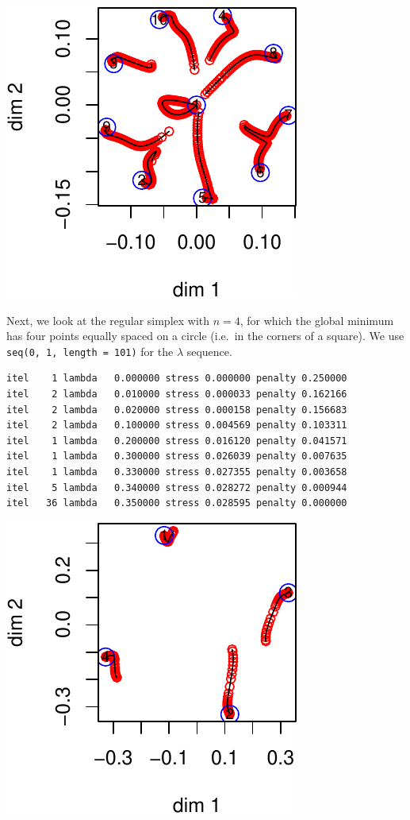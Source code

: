 \documentclass[
  12pt,
  letterpaper,
  DIV=11,
  numbers=noendperiod]{scrreprt}
\theoremstyle{remark}
\begin{document}
\begin{center}
\includegraphics{global_files/figure-pdf/simplex10a-1.pdf}
\end{center}

Next, we look at the regular simplex with \(n=4\), for which the global
minimum has four points equally spaced on a circle (i.e.~in the corners
of a square). We use \texttt{seq(0,\ 1,\ length\ =\ 101)} for the
\(\lambda\) sequence.

\begin{verbatim}
itel    1 lambda   0.000000 stress 0.000000 penalty 0.250000 
itel    2 lambda   0.010000 stress 0.000033 penalty 0.162166 
itel    2 lambda   0.020000 stress 0.000158 penalty 0.156683 
itel    2 lambda   0.100000 stress 0.004569 penalty 0.103311 
itel    1 lambda   0.200000 stress 0.016120 penalty 0.041571 
itel    1 lambda   0.300000 stress 0.026039 penalty 0.007635 
itel    1 lambda   0.330000 stress 0.027355 penalty 0.003658 
itel    5 lambda   0.340000 stress 0.028272 penalty 0.000944 
itel   36 lambda   0.350000 stress 0.028595 penalty 0.000000 
\end{verbatim}

\begin{center}
\includegraphics{global_files/figure-pdf/simplex4a-1.pdf}
\end{center}
\end{document}
